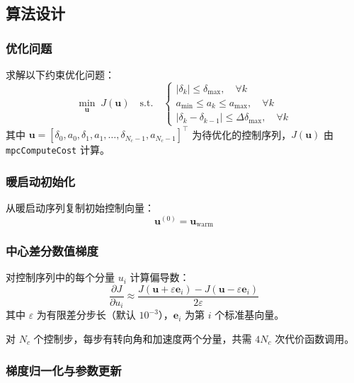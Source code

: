 \documentclass[a4paper,10pt]{article}
\begin{document}
\subsection{算法设计}

\subsubsection{优化问题}

求解以下约束优化问题：
\begin{equation}
  \min_{\mathbf{u}} \; J(\mathbf{u}) \quad \text{s.t.} \quad
  \begin{cases}
    |\delta_k| \leq \delta_{\max}, \quad \forall k \\
    a_{\min} \leq a_k \leq a_{\max}, \quad \forall k \\
    |\delta_k - \delta_{k-1}| \leq \Delta\delta_{\max}, \quad \forall k
  \end{cases}
\end{equation}
其中 $\mathbf{u} = [\delta_0, a_0, \delta_1, a_1, \ldots, \delta_{N_c-1}, a_{N_c-1}]^{\!\top}$
为待优化的控制序列，$J(\mathbf{u})$ 由 \texttt{mpcComputeCost} 计算。

\subsubsection{暖启动初始化}

从暖启动序列复制初始控制向量：
\begin{equation}
  \mathbf{u}^{(0)} = \mathbf{u}_{\text{warm}}
\end{equation}

\subsubsection{中心差分数值梯度}

对控制序列中的每个分量 $u_i$ 计算偏导数：
\begin{equation}
  \frac{\partial J}{\partial u_i} \approx \frac{J(\mathbf{u} + \varepsilon \mathbf{e}_i) - J(\mathbf{u} - \varepsilon \mathbf{e}_i)}{2\varepsilon}
\end{equation}
其中 $\varepsilon$ 为有限差分步长（默认 $10^{-3}$），$\mathbf{e}_i$ 为第 $i$ 个标准基向量。

对 $N_c$ 个控制步，每步有转向角和加速度两个分量，共需 $4 N_c$ 次代价函数调用。

\subsubsection{梯度归一化与参数更新}
\end{document}
